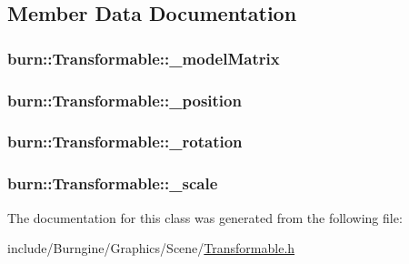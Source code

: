 \subsection{Member Data Documentation}
\hypertarget{classburn_1_1_transformable_a6a06bcec86a7f2e70eba6fe7e8bbe61c}{
\subsubsection[{\-\_\-model\-Matrix}]{ burn\-::\-Transformable\-::\-\_\-model\-Matrix\hspace{0.3cm}{\ttfamily [protected]}}}\label{classburn_1_1_transformable_a6a06bcec86a7f2e70eba6fe7e8bbe61c}
\hypertarget{classburn_1_1_transformable_a1cb1a52f8518c7c2f50e45d8cd902767}{
\subsubsection[{\-\_\-position}]{ burn\-::\-Transformable\-::\-\_\-position\hspace{0.3cm}{\ttfamily [protected]}}}\label{classburn_1_1_transformable_a1cb1a52f8518c7c2f50e45d8cd902767}
\hypertarget{classburn_1_1_transformable_ad62e417f44d78cbeedfd30e62c1b896d}{
\subsubsection[{\-\_\-rotation}]{ burn\-::\-Transformable\-::\-\_\-rotation\hspace{0.3cm}{\ttfamily [protected]}}}\label{classburn_1_1_transformable_ad62e417f44d78cbeedfd30e62c1b896d}
\hypertarget{classburn_1_1_transformable_a80e5ca4d02b2d58593b751b040e86492}{
\subsubsection[{\-\_\-scale}]{ burn\-::\-Transformable\-::\-\_\-scale\hspace{0.3cm}{\ttfamily [protected]}}}\label{classburn_1_1_transformable_a80e5ca4d02b2d58593b751b040e86492}


The documentation for this class was generated from the following file\-:\begin{DoxyCompactItemize}
\item 
include/\-Burngine/\-Graphics/\-Scene/\hyperlink{_transformable_8h}{Transformable.\-h}\end{DoxyCompactItemize}
